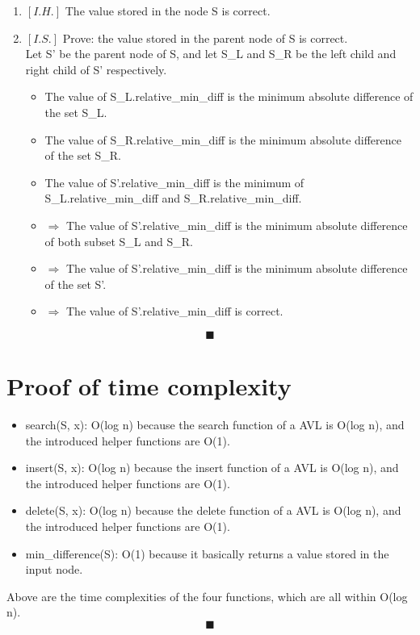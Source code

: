 \documentclass{article}
\begin{document}
\begin{itemize}
\begin{enumerate}
              \item  $\left[I.H.\right]$ The value stored in the node S is correct.

              \item $\left[I.S.\right]$ Prove: the value stored in the parent node of S is correct. \\
                    Let S' be the parent node of S, and let S\_L and S\_R be the left child and right child of S' respectively.
                    \begin{itemize}
                        \item The value of S\_L.relative\_min\_diff is the minimum absolute difference of the set S\_L.
                        \item The value of S\_R.relative\_min\_diff is the minimum absolute difference of the set S\_R.
                        \item The value of S'.relative\_min\_diff is the minimum of S\_L.relative\_min\_diff and S\_R.relative\_min\_diff.
                        \item $\Rightarrow$ The value of S'.relative\_min\_diff is the minimum absolute difference of both subset S\_L and S\_R.
                        \item $\Rightarrow$ The value of S'.relative\_min\_diff is the minimum absolute difference of the set S'.
                        \item $\Rightarrow$ The value of S'.relative\_min\_diff is correct.
                    \end{itemize}
          \end{enumerate}
\end{itemize}
$$ \blacksquare $$

\section*{Proof of time complexity}

\begin{itemize}
    \item search(S, x): O(log n) because the search function of a AVL is O(log n),
          and the introduced helper functions are O(1).
    \item insert(S, x): O(log n) because the insert function of a AVL is O(log n),
          and the introduced helper functions are O(1).
    \item delete(S, x): O(log n) because the delete function of a AVL is O(log n),
          and the introduced helper functions are O(1).
    \item min\_difference(S): O(1) because it basically returns a value stored in the input node.
\end{itemize}
Above are the time complexities of the four functions, which are all within O(log n).
$$ \blacksquare $$



\end{document}
